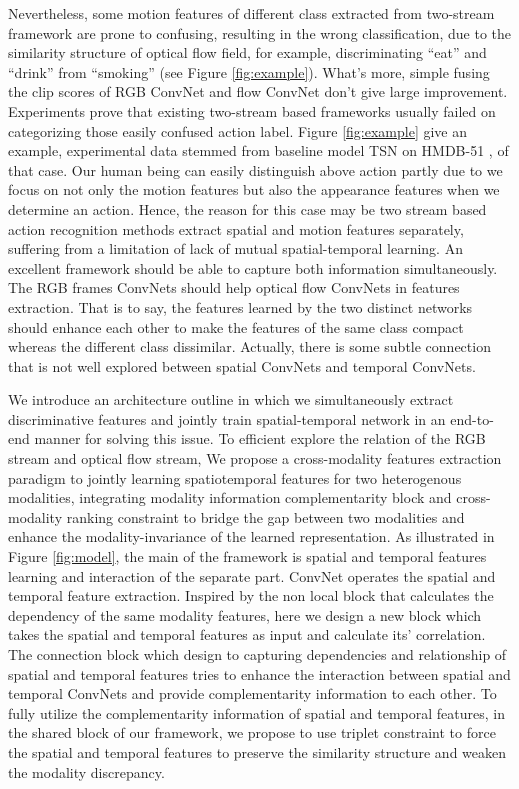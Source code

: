 \documentclass[conference,compsoc]{IEEEtran}
\begin{document}
Nevertheless, some motion features of different class extracted from two-stream framework are prone to confusing, resulting in the wrong classification, due to the similarity structure of optical flow field, for example, discriminating ``eat'' and ``drink'' from ``smoking'' (see Figure \ref{fig:example}). What's more, simple fusing the clip scores of RGB ConvNet and flow ConvNet don't give large improvement. Experiments prove that existing two-stream based frameworks usually failed on categorizing those easily confused action label. Figure \ref{fig:example} give an example, experimental data stemmed from baseline model TSN \cite{wang2016temporal} on HMDB-51 \cite{kuehne2013hmdb51}, of that case. Our human being can easily distinguish above action partly due to we focus on not only the motion features but also the appearance features when we determine an action. Hence, the reason for this case may be two stream based action recognition methods extract spatial and motion features separately, suffering from a limitation of lack of mutual spatial-temporal learning. An excellent framework should be able to capture both information simultaneously. The RGB frames ConvNets should help optical flow ConvNets in features extraction. That is to say, the features learned by the two distinct networks should enhance each other to make the features of the same class compact whereas the different class dissimilar. Actually, there is some subtle connection that is not well explored between spatial ConvNets and temporal ConvNets.


We introduce an architecture outline in which we simultaneously extract discriminative features and jointly train spatial-temporal network in an end-to-end manner for solving this issue. To efficient explore the relation of the RGB stream and optical flow stream, We propose a cross-modality features extraction paradigm to jointly learning spatiotemporal features for two heterogenous modalities, integrating modality information complementarity block and cross-modality ranking constraint to bridge the gap between two modalities and enhance the modality-invariance of the learned representation. As illustrated in Figure \ref{fig:model}, the main of the framework is spatial and temporal features learning and interaction of the separate part. ConvNet operates the spatial and temporal feature extraction. Inspired by the non local block that calculates the dependency of the same modality features, here we design a new block which takes the spatial and temporal features as input and calculate its' correlation. The connection block which design to capturing dependencies and relationship of spatial and temporal features tries to enhance the interaction between spatial and temporal ConvNets and provide complementarity information to each other. To fully utilize the complementarity information of spatial and temporal features, in the shared block of our framework, we propose to use triplet constraint to force the spatial and temporal features to preserve the similarity structure and weaken the modality discrepancy.
\end{document}
